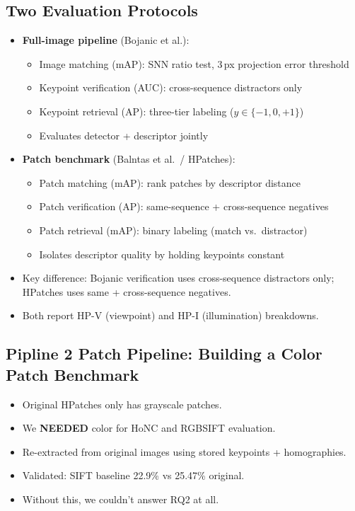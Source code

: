 \documentclass[11pt, letterpaper]{article}
\begin{document}
\subsection{Two Evaluation Protocols}
\begin{itemize}
  \item \textbf{Full-image pipeline} (Bojanic et al.):
    \begin{itemize}
      \item Image matching (mAP): SNN ratio test, 3\,px projection error threshold
      \item Keypoint verification (AUC): cross-sequence distractors only
      \item Keypoint retrieval (AP): three-tier labeling ($y \in \{-1, 0, +1\}$)
      \item Evaluates detector + descriptor jointly
    \end{itemize}
  \item \textbf{Patch benchmark} (Balntas et al.\ / HPatches):
    \begin{itemize}
      \item Patch matching (mAP): rank patches by descriptor distance
      \item Patch verification (AP): same-sequence + cross-sequence negatives
      \item Patch retrieval (mAP): binary labeling (match vs.\ distractor)
      \item Isolates descriptor quality by holding keypoints constant
    \end{itemize}
  \item Key difference: Bojanic verification uses cross-sequence distractors only; HPatches uses same + cross-sequence negatives.
  \item Both report HP-V (viewpoint) and HP-I (illumination) breakdowns.
\end{itemize}

\subsection{Pipline 2 Patch Pipeline: Building a Color Patch Benchmark}
\begin{itemize}
  \item Original HPatches only has grayscale patches.
  \item We \textbf{NEEDED} color for HoNC and RGBSIFT evaluation.
  \item Re-extracted from original images using stored keypoints + homographies.
  \item Validated: SIFT baseline 22.9\% vs 25.47\% original.
  \item Without this, we couldn't answer RQ2 at all.
\end{itemize}
\end{document}
